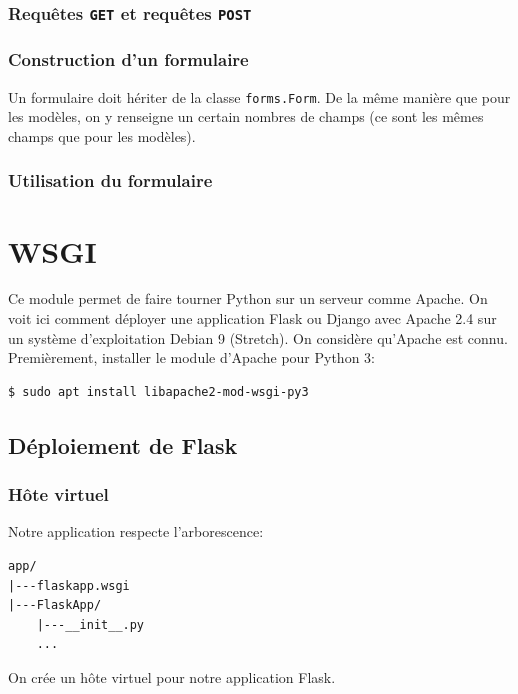 \documentclass[a4paper, 10pt]{article}
\begin{document}
\subsubsection{Requêtes \texttt{GET} et requêtes \texttt{POST}}

\subsubsection{Construction d'un formulaire}

Un formulaire doit hériter de la classe \texttt{forms.Form}. De la même manière que pour
les modèles, on y renseigne un certain nombres de champs (ce sont les mêmes champs que pour les modèles).

\subsubsection{Utilisation du formulaire}

\section{WSGI}
Ce module permet de faire tourner Python sur un serveur comme Apache. On voit ici comment déployer une application Flask ou Django avec Apache 2.4 sur un système d'exploitation Debian 9 (Stretch). On considère qu'Apache est connu. Premièrement, installer le module d'Apache pour Python 3:

\begin{verbatim}
$ sudo apt install libapache2-mod-wsgi-py3
\end{verbatim}

\subsection{Déploiement de Flask}
\subsubsection{Hôte virtuel}

Notre application respecte l'arborescence:
\begin{verbatim}
app/
|---flaskapp.wsgi
|---FlaskApp/
    |---__init__.py
    ...
\end{verbatim}

On crée un hôte virtuel pour notre application Flask.
\end{document}
